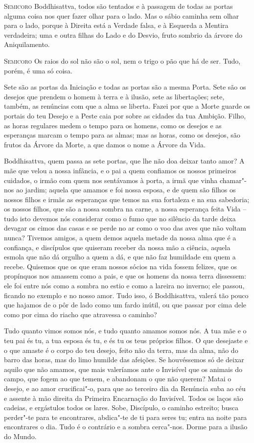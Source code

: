 \textsc{Semicoro} Boddhisattva, todos são tentados e à passagem de todas as
portas alguma coisa nos quer fazer olhar para o lado. Mas o sábio
caminha sem olhar para o lado, porque à Direita está a Verdade falsa,
e à Esquerda a Mentira verdadeira; uma e outra filhas do Lado e do
Desvio, fruto sombrio da árvore do Aniquilamento.

\textsc{Semicoro} Os raios do sol não são o sol, nem o trigo o pão que há de
ser. Tudo, porém, é uma só coisa.

Sete são as portas da Iniciação e todas as portas são a mesma Porta.
Sete são os desejos que prendem o homem à terra e à ilusão, sete as
libertações; sete, também, as renúncias com que a alma se liberta.
Fazei por que a Morte guarde os portais do teu Desejo e a Peste caia
por sobre as cidades da tua Ambição. Filho, as horas regulares medem
o tempo para os homens, como os desejos e as esperanças marcam o
tempo para as almas; mas as horas, como os desejos, são frutos da
Árvore da Morte, a que damos o nome a Árvore da Vida.

Boddhisattva, quem passa as sete portas, que lhe não doa deixar tanto
amor? A mãe que velou a nossa infância, e o pai a quem confiamos os
nossos primeiros cuidados, o irmão com quem nos sentávamos à porta, a
irmã que vinha chamar"-nos ao jardim; aquela que amamos e foi nossa
esposa, e de quem são filhos os nossos filhos e irmãs as esperanças
que temos na sua fortaleza e na sua sabedoria; os nossos filhos, que
são a nossa sombra na carne, a nossa esperança feita Vida -- tudo isto
devemos nós considerar como o fumo que no silêncio da tarde deixa
devagar os cimos das casas e se perde no ar como o voo das aves que
não voltam nunca? Tivemos amigos, a quem demos aquela metade da nossa
alma que é a confiança, e discípulos que quiseram receber da nossa
mão a ciência, aquela esmola que não dá orgulho a quem a dá, e que
não faz humildade em quem a recebe. Quisemos que os que eram nossos
sócios na vida fossem felizes, que os propínquos nos amassem como a
pais, e que os homens da nossa terra dissessem: ele foi entre nós
como a sombra no estio e como a lareira no inverno; ele passou,
ficando no exemplo e no nosso amor. Tudo isso, ó Boddhisattva, valerá
tão pouco que hajamos de o pôr de lado como um fardo inútil, ou que
passar por cima dele como por cima do riacho que atravessa o caminho?

Tudo quanto vimos somos nós, e tudo quanto amamos somos nós. A tua mãe
e o teu pai és tu, a tua esposa és tu, e és tu os teus próprios
filhos. O que desejaste e o que amaste é o corpo do teu desejo, feito
não da terra, mas da alma, não do barro das horas, mas do limo
humilde das afeições. Se houvéssemos só de deixar aquilo que não
amamos, que mais valeríamos ante o Invisível que os animais do campo,
que fogem ao que temem, e abandonam o que não querem? Matai o desejo,
e ao amor crucificai"-o, para que ao terceiro dia da Renúncia suba ao
céu e assente à mão direita da Primeira Encarnação do Invisível.
Todos os laços são cadeias, e ergástulos todos os lares. Sobe,
Discípulo, o caminho estreito; busca perder"-te para te encontrares,
abdica"-te de ti para seres tu; entra na noite para encontrares o dia.
Tudo é o contrário e a sombra cerca"-nos. Dorme para a ilusão do
Mundo.

